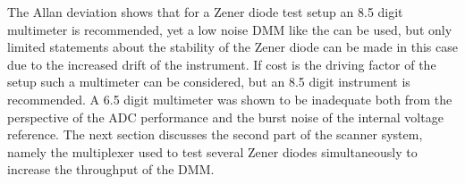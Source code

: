 The Allan deviation shows that for a Zener diode test setup an \num{8.5} digit multimeter is recommended, yet a low noise DMM like the  can be used, but only limited statements about the stability of the Zener diode can be made in this case due to the increased drift of the instrument. If cost is the driving factor of the setup such a multimeter can be considered, but an \num{8.5} digit instrument is recommended. A \num{6.5} digit multimeter was shown to be inadequate both from the perspective of the ADC performance and the burst noise of the internal voltage reference. The next section discusses the second part of the scanner system, namely the multiplexer used to test several Zener diodes simultaneously to increase the throughput of the DMM.
%



